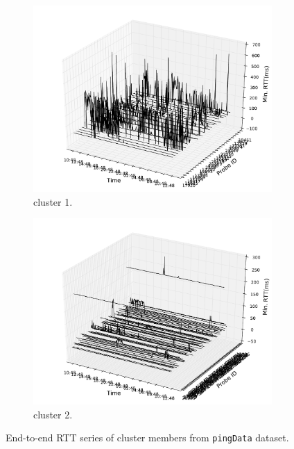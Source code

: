 \begin{figure}[!htb]
    \centering
    \begin{subfigure}[b]{\textwidth}
	\includegraphics[width=\textwidth]{gfx/chap3/rtt3d_ping_cls1.pdf}
	\caption{cluster 1.}
	\label{fig:ping_cls1}
	\end{subfigure}
	\begin{subfigure}[b]{\textwidth}
	\includegraphics[width=\textwidth]{gfx/chap3/rtt3d_ping_cls2.pdf}
	\caption{cluster 2.}
	\label{fig:ping_cls2}
	\end{subfigure}
\caption{End-to-end RTT series of cluster members from \texttt{pingData} dataset.}
\label{fig:rtt_ping}
\end{figure}

